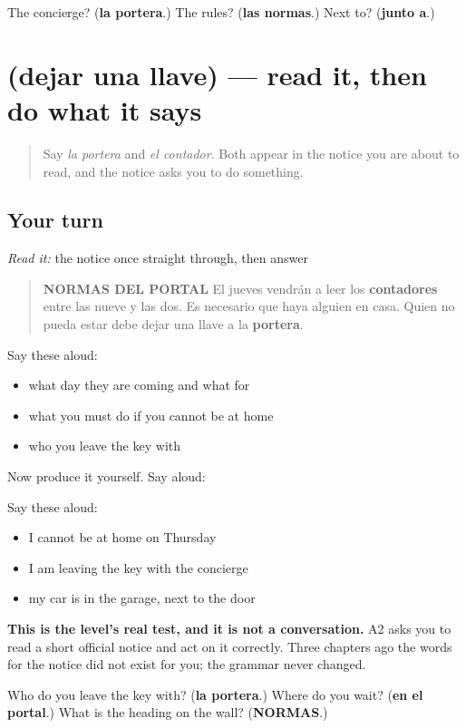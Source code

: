 \begin{tcolorbox}[breakable,colback=teal!4,colframe=teal!35!black,title={Before you move on}]
The concierge? (\textbf{la portera}.) The rules? (\textbf{las normas}.) Next to? (\textbf{junto a}.)
\end{tcolorbox}
\section[Practice]{(dejar una llave) — read it, then do what it says}

\label{lesson:ES-C433-sintesis-llave}



\begin{quote}
Say \emph{la portera} and \emph{el contador}. Both appear in the notice you are about to read, and the notice asks you to do something.
\end{quote}

\subsection*{Your turn}
\emph{Read it:} the notice once straight through, then answer

\begin{quote}
\textbf{NORMAS DEL PORTAL} El jueves vendrán a leer los \textbf{contadores} entre las nueve y las dos. Es necesario que haya alguien en casa. Quien no pueda estar debe dejar una llave a la \textbf{portera}.
\end{quote}

Say these aloud:

\begin{itemize}
\raggedright
  \item what day they are coming and what for
  \item what you must do if you cannot be at home
  \item who you leave the key with
\end{itemize}

\begin{grammarlens}[title={What you've built}]
Now produce it yourself. Say aloud:

Say these aloud:

\begin{itemize}
\raggedright
  \item I cannot be at home on Thursday
  \item I am leaving the key with the concierge
  \item my car is in the garage, next to the door
\end{itemize}

\textbf{This is the level's real test, and it is not a conversation.} A2 asks you to read a short official notice and act on it correctly. Three chapters ago the words for the notice did not exist for you; the grammar never changed.
\end{grammarlens}

\begin{tcolorbox}[breakable,colback=teal!4,colframe=teal!35!black,title={Before you move on}]
Who do you leave the key with? (\textbf{la portera}.) Where do you wait? (\textbf{en el portal}.) What is the heading on the wall? (\textbf{NORMAS}.)
\end{tcolorbox}
